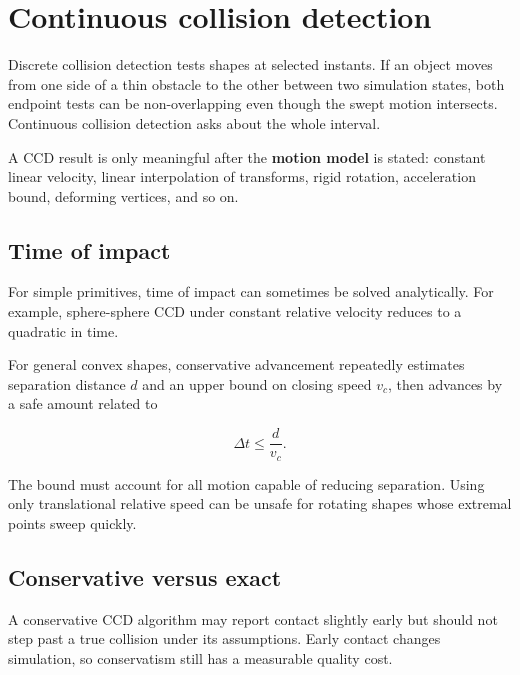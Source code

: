 \hypertarget{appendix-66956ed6c753}{}\label{referencestart:appendix-66956ed6c753}
\section{Continuous collision detection}\label{appendix-66956ed6c753-continuous-collision-detection}

\hypertarget{appendix-66956ed6c753-continuous-collision-detection}{}

Discrete collision detection tests shapes at selected instants. If an object moves from one side of a thin obstacle to the other between two simulation states, both endpoint tests can be non-overlapping even though the swept motion intersects. Continuous collision detection asks about the whole interval.

A CCD result is only meaningful after the \textbf{motion model} is stated: constant linear velocity, linear interpolation of transforms, rigid rotation, acceleration bound, deforming vertices, and so on.

\subsection{Time of impact}\label{appendix-66956ed6c753-time-of-impact}

\hypertarget{appendix-66956ed6c753-time-of-impact}{}

For simple primitives, time of impact can sometimes be solved analytically. For example, sphere-sphere CCD under constant relative velocity reduces to a quadratic in time.

For general convex shapes, conservative advancement repeatedly estimates separation distance \(d\) and an upper bound on closing speed \(v_c\), then advances by a safe amount related to

\[
\Delta t\le \frac{d}{v_c}.
\]

The bound must account for all motion capable of reducing separation. Using only translational relative speed can be unsafe for rotating shapes whose extremal points sweep quickly.

\subsection{Conservative versus exact}\label{appendix-66956ed6c753-conservative-versus-exact}

\hypertarget{appendix-66956ed6c753-conservative-versus-exact}{}

A conservative CCD algorithm may report contact slightly early but should not step past a true collision under its assumptions. Early contact changes simulation, so conservatism still has a measurable quality cost.

